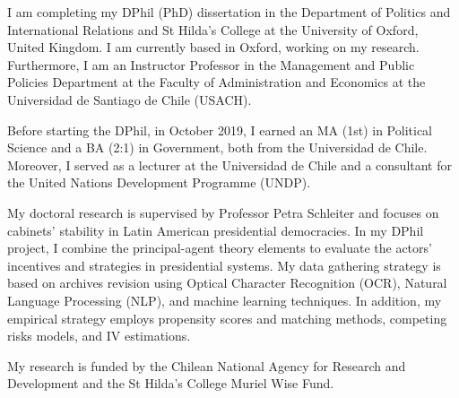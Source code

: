 




\vspace{3mm}

\begin{cvparagraph}

I am completing my DPhil (PhD) dissertation in the Department of Politics and International Relations and St Hilda’s College at the University of Oxford, United Kingdom. I am currently based in Oxford, working on my research. Furthermore, I am an Instructor Professor in the Management and Public Policies Department at the Faculty of Administration and Economics at the Universidad de Santiago de Chile (USACH).

Before starting the DPhil, in October 2019, I earned an MA (1st) in Political Science and a BA (2:1) in Government, both from the Universidad de Chile. Moreover, I served as a lecturer at the Universidad de Chile and a consultant for the United Nations Development Programme (UNDP).

My doctoral research is supervised by Professor Petra Schleiter and focuses on cabinets’ stability in Latin American presidential democracies. In my DPhil project, I combine the principal-agent theory elements to evaluate the actors’ incentives and strategies in presidential systems. My data gathering strategy is based on archives revision using Optical Character Recognition (OCR), Natural Language Processing (NLP), and machine learning techniques. In addition, my empirical strategy employs propensity scores and matching methods, competing risks models, and IV estimations. 

My research is funded by the Chilean National Agency for Research and Development and the St Hilda’s College Muriel Wise Fund.
\vspace{1mm}
\end{cvparagraph}
